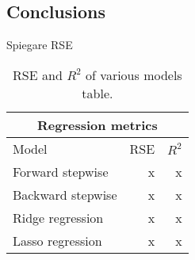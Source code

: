 \subsection{Conclusions}

Spiegare RSE

\begin{table}[H]
	\centering
	\begin{tabular}{|| l | r | r ||} 
		\hline
		\multicolumn{3}{|c|}{Regression metrics} \\
		\hline
		Model & RSE & $R^2$ \\
		\hline
		Forward stepwise & x & x \\
		\hline
		Backward stepwise & x & x \\
		\hline
		Ridge regression & x & x \\
		\hline
		Lasso regression & x & x \\
		\hline
	\end{tabular}
	\caption{RSE and $R^2$ of various models table.}
	\label{table:RegEvalParams}
\end{table}